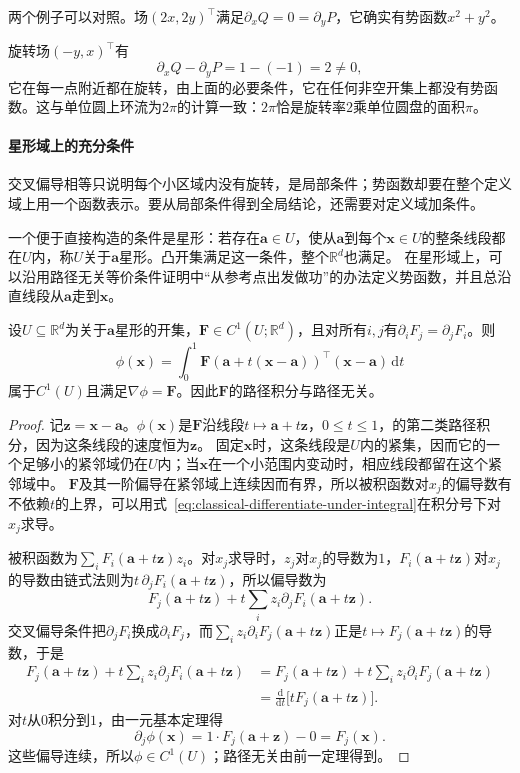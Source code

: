 两个例子可以对照。场$(2x,2y)^\top$满足$\partial_xQ=0=\partial_yP$，它确实有势函数$x^2+y^2$。

旋转场$(-y,x)^\top$有
\[
 \partial_xQ-\partial_yP=1-(-1)=2\neq0 ,
\]
它在每一点附近都在旋转，由上面的必要条件，它在任何非空开集上都没有势函数。这与单位圆上环流为$2\pi$的计算一致：$2\pi$恰是旋转率$2$乘单位圆盘的面积$\pi$。

\paragraph{星形域上的充分条件}

交叉偏导相等只说明每个小区域内没有旋转，是局部条件；势函数却要在整个定义域上用一个函数表示。要从局部条件得到全局结论，还需要对定义域加条件。

一个便于直接构造的条件是星形：若存在$\bm a\in U$，使从$\bm a$到每个$\bm x\in U$的整条线段都在$U$内，称$U$关于$\bm a$星形。凸开集满足这一条件，整个$\mathbb R^d$也满足。
在星形域上，可以沿用路径无关等价条件证明中“从参考点出发做功”的办法定义势函数，并且总沿直线段从$\bm a$走到$\bm x$。
\begin{theorem}[星形域上势函数的构造]
设$U\subseteq\mathbb R^d$为关于$\bm a$星形的开集，$\bm F\in C^1(U;\mathbb R^d)$，且对所有$i,j$有$\partial_iF_j=\partial_jF_i$。则
\begin{equation}
 \phi(\bm x)=\int_0^1\bm F(\bm a+t(\bm x-\bm a))^\top(\bm x-\bm a)\,\mathrm dt
\label{eq:analysis-star-domain-potential}
\end{equation}
属于$C^1(U)$且满足$\nabla\phi=\bm F$。因此$\bm F$的路径积分与路径无关。
\end{theorem}
\begin{proof}
记$\bm z=\bm x-\bm a$。$\phi(\bm x)$是$\bm F$沿线段$t\mapsto\bm a+t\bm z$，$0\leq t\leq1$，的第二类路径积分，因为这条线段的速度恒为$\bm z$。
固定$\bm x$时，这条线段是$U$内的紧集，因而它的一个足够小的紧邻域仍在$U$内；当$\bm x$在一个小范围内变动时，相应线段都留在这个紧邻域中。
$\bm F$及其一阶偏导在紧邻域上连续因而有界，所以被积函数对$x_j$的偏导数有不依赖$t$的上界，可以用式~\eqref{eq:classical-differentiate-under-integral}在积分号下对$x_j$求导。

被积函数为$\sum_iF_i(\bm a+t\bm z)z_i$。对$x_j$求导时，$z_j$对$x_j$的导数为$1$，$F_i(\bm a+t\bm z)$对$x_j$的导数由链式法则为$t\,\partial_jF_i(\bm a+t\bm z)$，所以偏导数为
\[
 F_j(\bm a+t\bm z)+t\sum_i z_i\partial_jF_i(\bm a+t\bm z).
\]
交叉偏导条件把$\partial_jF_i$换成$\partial_iF_j$，而$\sum_iz_i\partial_iF_j(\bm a+t\bm z)$正是$t\mapsto F_j(\bm a+t\bm z)$的导数，于是
\[
 \begin{aligned}
 F_j(\bm a+t\bm z)+t\sum_i z_i\partial_jF_i(\bm a+t\bm z)
 &=F_j(\bm a+t\bm z)+t\sum_i z_i\partial_iF_j(\bm a+t\bm z)\\
 &=\frac{\mathrm d}{\mathrm dt}\bigl[tF_j(\bm a+t\bm z)\bigr].
 \end{aligned}
\]
对$t$从$0$积分到$1$，由一元基本定理得
\[
 \partial_j\phi(\bm x)=1\cdot F_j(\bm a+\bm z)-0=F_j(\bm x).
\]
这些偏导连续，所以$\phi\in C^1(U)$；路径无关由前一定理得到。
\end{proof}

